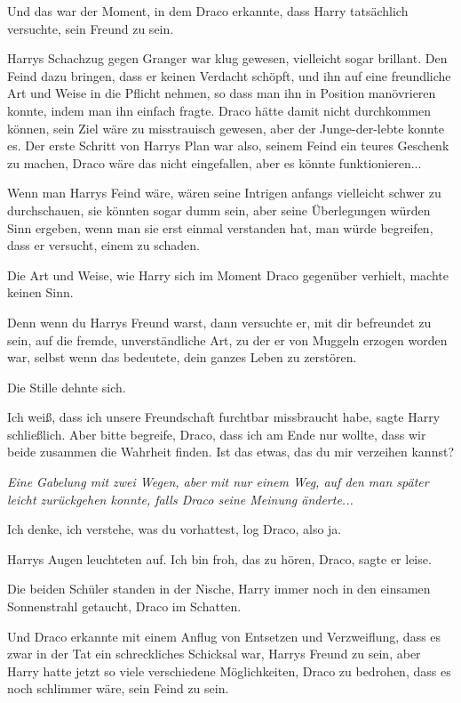 Und das war der Moment, in dem Draco erkannte, dass Harry tatsächlich versuchte,
sein Freund zu sein.

Harrys Schachzug gegen Granger war klug gewesen, vielleicht sogar brillant. Den
Feind dazu bringen, dass er keinen Verdacht schöpft, und ihn auf eine
freundliche Art und Weise in die Pflicht nehmen, so dass man ihn in Position
manövrieren konnte, indem man ihn einfach fragte. Draco hätte damit nicht
durchkommen können, sein Ziel wäre zu misstrauisch gewesen, aber der
Junge-der-lebte konnte es. Der erste Schritt von Harrys Plan war also, seinem
Feind ein teures Geschenk zu machen, Draco wäre das nicht eingefallen, aber es
könnte funktionieren...

Wenn man Harrys Feind wäre, wären seine Intrigen anfangs vielleicht schwer zu
durchschauen, sie könnten sogar dumm sein, aber seine Überlegungen würden Sinn
ergeben, wenn man sie erst einmal verstanden hat, man würde begreifen, dass er
versucht, einem zu schaden.

Die Art und Weise, wie Harry sich im Moment Draco gegenüber verhielt, machte
keinen Sinn.

Denn wenn du Harrys Freund warst, dann versuchte er, mit dir befreundet zu sein,
auf die fremde, unverständliche Art, zu der er von Muggeln erzogen worden war,
selbst wenn das bedeutete, dein ganzes Leben zu zerstören.

Die Stille dehnte sich.

\glqq{}Ich weiß, dass ich unsere Freundschaft furchtbar missbraucht habe\grqq{},
sagte Harry schließlich. \glqq{}Aber bitte begreife, Draco, dass ich am Ende nur
wollte, dass wir beide zusammen die Wahrheit finden. Ist das etwas, das du mir
verzeihen kannst?\grqq{}

\emph{Eine Gabelung mit zwei Wegen, aber mit nur einem Weg, auf den man später
leicht zurückgehen konnte, falls Draco seine Meinung änderte...}

\glqq{}Ich denke, ich verstehe, was du vorhattest\grqq{}, log Draco, \glqq{}also
ja.\grqq{}

Harrys Augen leuchteten auf. \glqq{}Ich bin froh, das zu hören, Draco\grqq{},
sagte er leise.

Die beiden Schüler standen in der Nische, Harry immer noch in den einsamen
Sonnenstrahl getaucht, Draco im Schatten.

Und Draco erkannte mit einem Anflug von Entsetzen und Verzweiflung, dass es zwar
in der Tat ein schreckliches Schicksal war, Harrys Freund zu sein, aber Harry
hatte jetzt so viele verschiedene Möglichkeiten, Draco zu bedrohen, dass es noch
schlimmer wäre, sein Feind zu sein.

